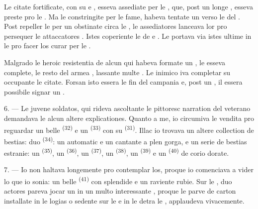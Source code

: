 Le citate fortificate, con su  e , esseva
assediate per le , que, post un longe ,
esseva preste pro le . Ma le  constringite per
le fame, habeva tentate un  verso le  del
. Post repeller le  per un obstinate
 circa le , le assediatores
 lanceava lor  pro persequer le
attaccatores . Istes  coperiente le
 de  e . Le
 portava via istes ultime in le  pro
facer los curar per le .

Malgrado le heroic resistentia de alcun  qui habeva formate
un , le  esseva complete, le resto del armea
, lassante multe . Le inimico iva completar su
 occupante le citate. Forsan isto essera le fin del campania e,
post un , il essera possibile signar un .

\VUsaut{4.4mm}
\VUsaut{2.8mm}

6. --- Le juvene soldatos, qui rideva ascoltante le pittoresc narration del
veterano demandava le alcun altere explicationes. Quanto a me, io circumiva le
vendita pro reguardar un belle  \textsuperscript{(32)} e un
 \textsuperscript{(33)} con su 
\textsuperscript{(31)}. Illac io trovava un altere collection de bestias: duo
 \textsuperscript{(34)}: un  automatic e
un  cantante a plen gorga, e un serie de bestias estranie: un
 \textsuperscript{(35)}, un 
\textsuperscript{(36)}, un  \textsuperscript{(37)}, un
 \textsuperscript{(38)}, un  \textsuperscript{(39)}
e un  \textsuperscript{(40)} de corio dorate.

7. --- Io non haltava longemente pro contemplar los, proque io comenciava a vider
lo que io sonia: un belle 
\textsuperscript{(41)} con splendide  e un raviente
 rubie. Sur le , duo actores pareva jocar un
 in un multo interessante , proque le parve
 de carton installate in le logias o sedente sur le
 e in le  detra le , applaudeva vivacemente.

